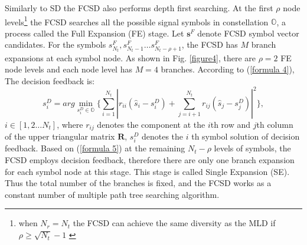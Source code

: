\documentclass[letterpaper, 10pt, conference, twoside]{ieeeconf}
\begin{document}
Similarly to SD the FCSD also performs depth first searching. At the first $\rho$ node levels\footnote{when $N_{r}=N_{t}$ the FCSD can achieve the same diversity as the MLD if $\rho\geq \sqrt{N_{t}}-1$ \cite{barbero2008fixing}} the FCSD searches all the possible signal symbols in constellation $\mathbb{O}$, a process called the Full Expansion (FE) stage. Let $\mathbf{s}^{F}$ denote FCSD symbol vector candidates. For the symbols $s^{F}_{N_{t}}, s^{F}_{N_{t}-1}\dots s^{F}_{N_{t}-\rho+1}$, the FCSD has $M$ branch expansions at each symbol node. As shown in Fig. \ref{figure4}, there are $\rho=2$ FE node levels and each node level has $M=4$ branches. According to (\ref{formula 4}), The decision feedback is: 
\begin{equation}
s^{D}_{i}=arg\min_{s^{D}_{i}\in \mathbb{O}}\{\sum_{i=1}^{N_{t}}|r_{ii}(\hat{s}_{i}-s^{D}_{i})+\sum_{j=i+1}^{N_{t}}r_{ij}(\hat{s}_{j}-s^{D}_{j})|^{2}\},  \label{formula 5}
\end{equation} 
$i\in [1,2\dots N_{t}]$, where $r_{ij}$ denotes the component at the $i$th row and $j$th column of the upper triangular matrix $\mathbf{R}$, $s^{D}_{i}$ denotes the $i$ th symbol solution of decision feedback. Based on (\ref{formula 5}) at the remaining $N_{t}-\rho$ levels of symbols, the FCSD employs decision feedback, therefore there are only one branch expansion for each symbol node at this stage. This stage is called Single Expansion (SE). 
Thus the total number of the branches is fixed, and the FCSD works as a constant number of multiple path tree searching algorithm.
\end{document}
